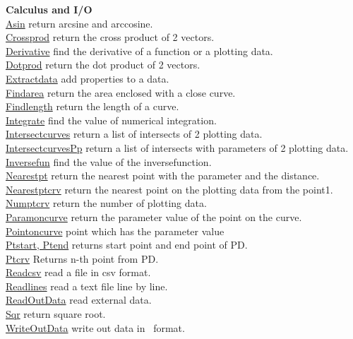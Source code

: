 \documentclass[papersize,a4paper,12pt]{article}
\begin{document}
\begin{tabbing}
{\bf Calculus and I/O} \> \\
\hyperlink{asin}{Asin} \> return arcsine and arccosine.\\
\hyperlink{crossprod}{Crossprod} \> return the cross product of 2 vectors.\\
\hyperlink{derivative}{Derivative} \> find the derivative of a function or a plotting data.\\
\hyperlink{dotprod}{Dotprod} \> return the dot product of 2 vectors.\\
\hyperlink{extractdata}{Extractdata} \> add properties to a data.\\
\hyperlink{findarea}{Findarea} \> return the area enclosed with a close curve.\\
\hyperlink{findlength}{Findlength} \> return the length of a curve.\\
\hyperlink{integrate}{Integrate} \> find the value of numerical integration.\\
\hyperlink{intersectcurves}{Intersectcurves} \> return a list of intersects of 2 plotting data.\\
\hyperlink{intersectcurvesPp}{IntersectcurvesPp} \> return a list of intersects with parameters of 2 plotting data.\\
\hyperlink{inversefun}{Inversefun} \> find the value of the inversefunction.\\
\hyperlink{nearestpt}{Nearestpt} \> return the nearest point with the parameter and the distance.\\
\hyperlink{nearestptcrv}{Nearestptcrv} \> return the nearest point on the plotting data from the point1.\\
\hyperlink{numptcrv}{Numptcrv} \> return the number of plotting data.\\
\hyperlink{paramoncurve}{Paramoncurve} \> return the parameter value of the point on the curve.\\
\hyperlink{pointoncurve}{Pointoncurve} \> point which has the parameter value\\
\hyperlink{ptstart, ptend}{Ptstart, Ptend} \> returns start point and end point of PD.\\
\hyperlink{ptcrv}{Ptcrv} \> Returns n-th point from PD.\\
\hyperlink{readcsv}{Readcsv} \> read a file in csv format.\\
\hyperlink{readlines}{Readlines} \> read a text file line by line.\\
\hyperlink{readoutdata}{ReadOutData} \> read external data.\\
\hyperlink{sqr}{Sqr} \> return square root.\\
\hyperlink{writeoutdata}{WriteOutData} \> write out data in \ketcindy\ format.\\


\end{tabbing}
\end{document}
